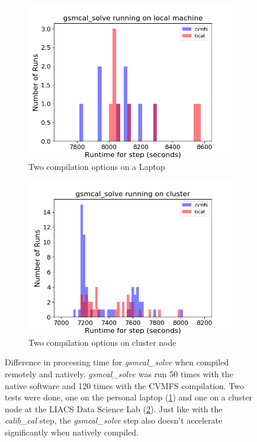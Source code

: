 \begin{figure}
  \centering
     \begin{subfigure}{.45\linewidth}
    \includegraphics[width=\linewidth]{ch4/figures/ppr2_gsm_local.png}
    \caption{Two compilation options on a Laptop}
	\label{fig:cmvfs1_gsmcal}
    \end{subfigure}%
    \begin{subfigure}{.45\linewidth}
     \includegraphics[width=\linewidth]{ch4/figures/ppr2_gsm_cluster.png}
    \caption{Two compilation options on cluster node}
	\label{fig:cmvfs2_gsmcal}
    \end{subfigure}%
      \caption{Difference in processing time for \textit{gsmcal\_solve} when compiled remotely and natively. \textit{gsmcal\_solve} was run 50 times with the native software and 120 times with the CVMFS compilation. Two tests were done, one on the personal laptop (\ref{fig:cmvfs1_gsmcal}) and one on a cluster node at the LIACS Data Science Lab (\ref{fig:cmvfs2_gsmcal}). Just like with the \textit{calib\_cal} step, the \textit{gsmcal\_solve} step also doesn't accelerate significantly when natively compiled.} 
	\label{fig:cvmfs_native_gsm}
\end{figure}

